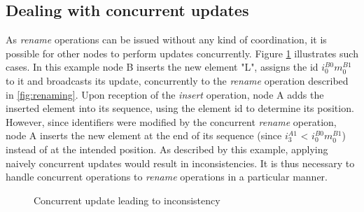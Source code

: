 \documentclass[sigplan,10pt,authorversion]{acmart}
\newcommand{\trm}[1]{\mathit{#1}}
\newcommand{\id}[3]{$\trm{#1}^{\trm{#2}}_{\trm{#3}}$}
\newcommand{\widthletter}{7mm}
\newcommand{\widthblock}{11mm}
\begin{document}
\subsection{Dealing with concurrent updates}

\label{sec:dealing-with-concurrent-updates}

As \emph{rename} operations can be issued without any kind of coordination, it is possible for other nodes to perform updates concurrently.
Figure \ref{fig:concurrent-insert-rename-inconsistent} illustrates such cases.
In this example node B inserts the new element "L", assigns the id \id{i}{B0}{0}\id{m}{B1}{0} to it and broadcasts its update, concurrently to the \emph{rename} operation described in \autoref{fig:renaming}.
Upon reception of the \emph{insert} operation, node A adds the inserted element into its sequence, using the element id to determine its position.
However, since identifiers were modified by the concurrent \emph{rename} operation, node A inserts the new element at the end of its sequence (since \id{i}{A1}{3} < \id{i}{B0}{0}\id{m}{B1}{0}) instead of at the intended position.
As described by this example, applying naively concurrent updates would result in inconsistencies.
It is thus necessary to handle concurrent operations to \emph{rename} operations in a particular manner.

\begin{figure}[ht!]
    \centering
    \caption{Concurrent update leading to inconsistency}
    \label{fig:concurrent-insert-rename-inconsistent}
\end{figure}
\end{document}
